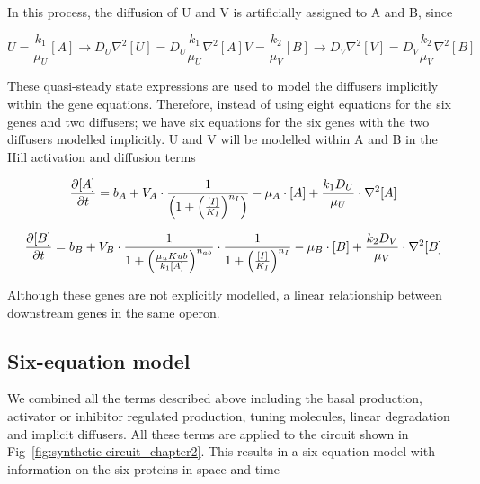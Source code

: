 In this process, the diffusion of U and V is artificially assigned to A and B, since

\begin{subequations}\label{[diffuser_artificial]}

\begin{equation}
    U = \frac{k_{1}}{\mu_{U}}[A] \longrightarrow D_{U}
    \nabla^2 [U] = D_{U}\frac{k_{1}}{\mu_{U}}  \nabla^2  [A]\label{eq:equation2}
\end{equation}

\begin{equation}
    V = \frac{k_{2}}{\mu_{V}}[B] \longrightarrow D_{V}
    \nabla^2 [V] =  D_{V}\frac{k_{2}}{\mu_{V}}  \nabla^2  [B]\label{eq:equation}
\end{equation}

\end{subequations}

These quasi-steady state expressions are used to model the diffusers implicitly within the gene equations.
Therefore, instead of using eight equations for the six genes and two diffusers;
we have six equations for the six genes with the two diffusers modelled implicitly.
U and V will be modelled within A and B in the Hill activation and diffusion terms

\begin{equation}
    \pdv{[A]}{t} = b_{A}+V_{A}\cdot \frac{1}{\left(1+\left(\frac{[I]}{K_{I}}\right)^{n_{I}}\right)}-\mu_{A}\cdot[A] + \frac{k_{1}D_{U}}{\mu_{U}}\cdot \nabla^2 [A]
\end{equation}

\begin{equation}
    \pdv{[B]}{t} = b_{B}+V_{B}\cdot\frac{1}{1+\left(\frac{\mu_{u}K{ub}}{k_{1}[A]}\right)^{n_{ab}}}\cdot\frac{1}{1+\left(\frac{[I]}{K_{I}}\right)^{n_{I}}}-\mu_{B}\cdot[B] + \frac{k_{2}D_{V}}{\mu_{V}}\cdot \nabla^2 [B]
\end{equation}

Although these genes are not explicitly modelled, a linear relationship between downstream genes in the same operon.

\subsection{Six-equation model}
We combined all the terms described above including the basal production,
activator or inhibitor regulated production, tuning molecules, linear degradation and implicit diffusers.
All these terms are applied to the circuit shown in Fig~\ref{fig:synthetic circuit_chapter2}.
This results in a six equation model with information on the six proteins in space and time


